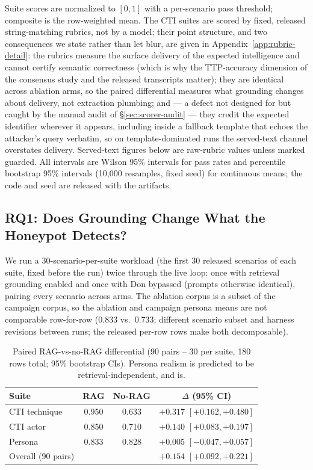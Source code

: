 Suite scores are normalized to $[0,1]$ with a per-scenario pass threshold;
composite is the row-weighted mean. The CTI suites are scored by fixed,
released string-matching rubrics, not by a model; their point structure,
and two consequences we state rather than let blur, are given in
Appendix~\ref{app:rubric-detail}: the rubrics measure the surface
delivery of the expected intelligence and cannot certify semantic
correctness (which is why the TTP-accuracy dimension of the consensus
study and the released transcripts matter); they are identical across
ablation arms, so the paired differential measures what grounding changes
about delivery, not extraction plumbing; and --- a defect not designed for
but caught by the manual audit of \S\ref{sec:scorer-audit} --- they credit
the expected identifier wherever it appears, including inside a fallback
template that echoes the attacker's query verbatim, so on template-dominated
runs the served-text channel overstates delivery. Served-text figures
below are raw-rubric values unless marked guarded. All intervals are
Wilson 95\% intervals for pass rates and percentile bootstrap 95\%
intervals (10{,}000 resamples, fixed seed) for continuous means; the code
and seed are released with the artifacts.

\subsection{RQ1: Does Grounding Change What the Honeypot Detects?}
\label{sec:rq1}

We run a 30-scenario-per-suite workload (the first 30 released scenarios
of each suite, fixed before the run) twice through the live loop: once
with retrieval grounding enabled and once with Don bypassed (prompts
otherwise identical), pairing every scenario across arms. The ablation
corpus is a subset of the campaign corpus, so the ablation and campaign
persona means are not comparable row-for-row (0.833 vs.\ 0.733; different
scenario subset and harness revisions between runs; the released per-row
rows make both decomposable).

\begin{table}[t]
\centering
\caption{Paired RAG-vs-no-RAG differential (90 pairs -- 30 per suite,
180 rows total; 95\% bootstrap CIs). Persona realism is predicted to be
retrieval-independent, and is.}
\label{tab:b4}
\begin{tabular}{lccc}
\toprule
Suite & RAG & No-RAG & $\Delta$ (95\% CI) \\
\midrule
CTI technique & 0.950 & 0.633 & $+0.317$ $[+0.162, +0.480]$ \\
CTI actor     & 0.850 & 0.710 & $+0.140$ $[+0.083, +0.197]$ \\
Persona       & 0.833 & 0.828 & $+0.005$ $[-0.047, +0.057]$ \\
\midrule
Overall (90 pairs) & & & $+0.154$ $[+0.092, +0.221]$ \\
\bottomrule
\end{tabular}
\end{table}

